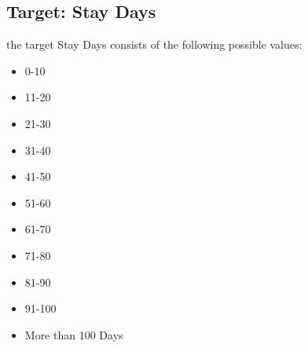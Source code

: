 \documentclass[fleqn]{article}
\begin{document}
		\subsection*{Target: Stay Days}
			
			the target Stay Days consists of the following possible values:\\
			
			\begin{itemize}
				\item 0-10
				\item 11-20
				\item 21-30
				\item 31-40 
				\item 41-50
				\item 51-60
				\item 61-70
				\item 71-80
				\item 81-90
				\item 91-100
				\item More than 100 Days   
			\end{itemize}
			
\end{document}
